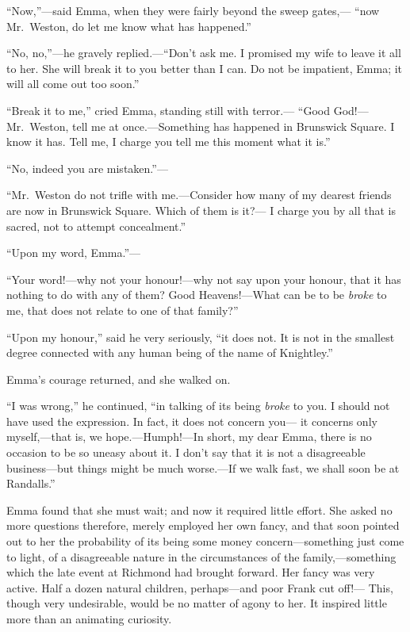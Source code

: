 ``Now,''---said Emma, when they were fairly beyond the sweep gates,---%
``now Mr.\ Weston, do let me know what has happened.''

``No, no,''---he gravely replied.---``Don't ask me.  I promised my wife
to leave it all to her.  She will break it to you better than I can.
Do not be impatient, Emma; it will all come out too soon.''

``Break it to me,'' cried Emma, standing still with terror.---%
``Good God!---Mr.\ Weston, tell me at once.---Something has happened
in Brunswick Square.  I know it has.  Tell me, I charge you tell
me this moment what it is.''

``No, indeed you are mistaken.''---%

``Mr.\ Weston do not trifle with me.---Consider how many of my dearest
friends are now in Brunswick Square.  Which of them is it?---%
I charge you by all that is sacred, not to attempt concealment.''

``Upon my word, Emma.''---%

``Your word!---why not your honour!---why not say upon your honour,
that it has nothing to do with any of them?  Good Heavens!---What can
be to be \emph{broke} to me, that does not relate to one of that family?''

``Upon my honour,'' said he very seriously, ``it does not.  It is not
in the smallest degree connected with any human being of the name
of Knightley.''

Emma's courage returned, and she walked on.

``I was wrong,'' he continued, ``in talking of its being \emph{broke} to you.
I should not have used the expression.  In fact, it does not concern you---%
it concerns only myself,---that is, we hope.---Humph!---In short,
my dear Emma, there is no occasion to be so uneasy about it.
I don't say that it is not a disagreeable business---but things might
be much worse.---If we walk fast, we shall soon be at Randalls.''

Emma found that she must wait; and now it required little effort.
She asked no more questions therefore, merely employed her own fancy,
and that soon pointed out to her the probability of its being some
money concern---something just come to light, of a disagreeable
nature in the circumstances of the family,---something which the late
event at Richmond had brought forward.  Her fancy was very active.
Half a dozen natural children, perhaps---and poor Frank cut off!---%
This, though very undesirable, would be no matter of agony to her.
It inspired little more than an animating curiosity.

